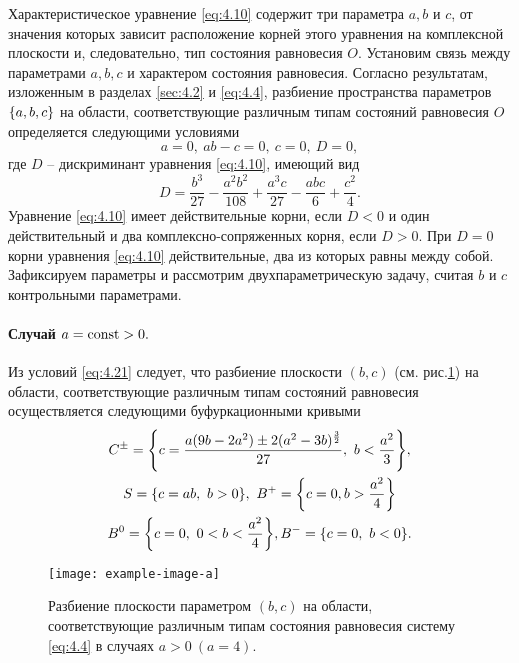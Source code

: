 Характеристическое уравнение \eqref{eq:4.10} содержит три параметра $a,b$ и $c$, от значения которых зависит расположение корней этого уравнения на комплексной плоскости и, следовательно, тип состояния равновесия $O$. Установим связь между параметрами $a,b,c$ и характером состояния равновесия. Согласно результатам, изложенным в разделах \ref{sec:4.2} и \ref{eq:4.4}, разбиение пространства параметров $\qty{a,b,c}$ на области, соответствующие различным типам состояний равновесия  $O$ определяется следующими условиями  
\begin{equation}
        \label{eq:4.21}
        a=0, ~ ab-c=0,~ c=0,~ D=0,
\end{equation}
где $D$ -- дискриминант уравнения \eqref{eq:4.10}, имеющий вид
\begin{equation}
        \label{eq:}
        D = \frac{b^3}{27} - \frac{a^2b^2}{108} + \frac{a^3c}{27} - \frac{abc}{6} + \frac{c^2}{4}.
\end{equation}
Уравнение \eqref{eq:4.10} имеет действительные корни, если $D<0$ и один действительный и два комплексно-сопряженных корня, если $D>0$. При $D=0$ корни уравнения \eqref{eq:4.10} действительные, два из которых равны между собой. Зафиксируем параметры и рассмотрим двухпараметрическую задачу, считая $b$ и $c$ контрольными параметрами.

\paragraph{Случай $a=\textrm{const} >0.$}%
\label{par:sluchai_a_const_0_}

Из условий \eqref{eq:4.21} следует, что разбиение плоскости $(b,c)$ (см. рис.\ref{fig:4.7})
на области, соответствующие различным типам состояний равновесия осуществляется следующими буфуркационными кривыми 
\begin{gather}
        C^{\pm} = \qty{ c = \frac{ a(9b-2a^2) \pm 2(a^2-3b)^{\frac{3}{2}}}{27},~ b<\frac{a^2}{3}},\\
        S = \qty{ c= ab, ~ b>0}, ~ B^+ = \qty{c=0, b> \frac{a^2}{4}} \\
        B^0 = \qty{c=0, ~ 0<b<\frac{a^2}{4} }, B^- =\qty{c=0,~b<0}.
\end{gather}

\begin{figure}[h!]
        \centering
        \texttt{[image: example-image-a]}
        \caption{Разбиение плоскости параметром $(b,c)$ на области, соответствующие различным типам состояния равновесия систему \eqref{eq:4.4} в случаях $a>0 ~ (a=4)$.}
        \label{fig:4.7}
\end{figure}

